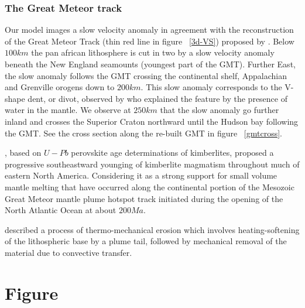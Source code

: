 \documentclass[12pt]{article}
\begin{document}
\subsubsection{The Great Meteor track}

	Our model images a slow velocity anomaly in agreement with the reconstruction of the Great Meteor Track (thin red line in figure ~\ref{3d-VS}) proposed by \cite{heaman2000timing}.
	Below $100km$ the pan african lithosphere is cut in two by a slow velocity anomaly beneath the New England seamounts (youngest part of the GMT). Further East, the slow anomaly follows the GMT crossing the continental shelf, Appalachian and Grenville orogens down to $200km$. 
	This slow anomaly corresponds to the V-shape dent, or divot, observed by \cite{lee1997upper} who explained the feature by the presence of water in the mantle. 
	We observe at $250km$ that the slow anomaly go further inland and crosses the Superior Craton northward until the Hudson bay following the GMT.
	See the cross section along the re-built GMT in figure ~\ref{gmtcross}.

	\cite{heaman2000timing}, based on $U-Pb$ perovskite age determinations of kimberlites, proposed a progressive southeastward younging of kimberlite magmatism throughout much of eastern North America. Considering it as a strong support for small volume mantle melting that have occurred along the continental portion of the Mesozoic Great Meteor mantle plume hotspot track initiated during the opening of the North Atlantic Ocean at about $200Ma$. \citep[See figure 4. in][]{heaman2000timing}

	\cite{davies1994thermomechanical} described a process of thermo-mechanical erosion which involves heating-softening of the lithospheric base by a plume tail, followed by mechanical removal of the material due to convective transfer. \citep{rondenay2000lithospheric}



\section{Figure}
\end{document}
